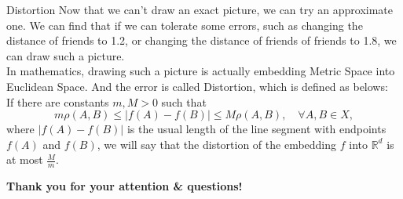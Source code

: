 \documentclass[xcolor=dvipsnames]{beamer}
\theoremstyle{remark}
\def \cbf {\color{blue}\bf}
\begin{document}
\begin{frame}{Distortion}
  Now that we can't draw an exact picture, we can try an approximate one. We can find that if we can tolerate some errors, such as changing the distance of friends to 1.2, or changing the distance of friends of friends to 1.8, we can draw such a picture.\\
  In mathematics, drawing such a picture is actually embedding Metric Space into Euclidean Space. And the error is called Distortion, which is defined as belows: \\
  If there are constants \( m, M > 0 \) such that
  \[
  m \rho(A, B) \leq | f(A) - f(B) | \leq M \rho(A, B), \quad \forall A, B \in X,
  \]
  where \( | f(A) - f(B) | \) is the usual length of the line segment with endpoints \( f(A) \) and \( f(B) \), we will say that the distortion of the embedding \( f \) into \( \mathbb{R}^d \) is at most \( \frac{M}{m} \).

\end{frame}



\begin{frame}
 
    {\Large \cbf Thank you for your attention \& questions! }
   
\end{frame}
   
\end{document}
